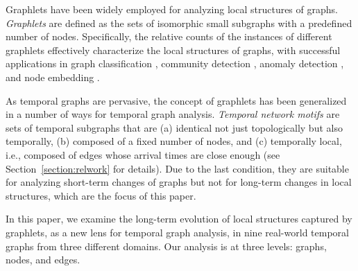 
Graphlets have been widely employed for analyzing local structures of graphs.
\textit{Graphlets} \cite{prvzulj2007biological} are defined as the sets of isomorphic small subgraphs with a predefined number of nodes.
Specifically, the relative counts of the instances of different graphlets effectively characterize the local structures of graphs, with successful applications in graph classification \cite{milo2002network,milo2004superfamilies}, community detection \cite{arenas2008motif,benson2016higher,tsourakakis2017scalable}, anomaly detection \cite{juszczyszyn2011motif}, and node embedding \cite{liu2021motif,lee2019graph,yu2019rum}.



As temporal graphs are pervasive, the concept of graphlets has been generalized in a number of ways for temporal graph analysis. 
\textit{Temporal network motifs} \cite{paranjape2017motifs, kovanen2011temporal} are sets of temporal subgraphs that are (a) identical not just topologically but also temporally, %
(b) composed of a fixed number of nodes, and (c) temporally local, i.e., composed of edges whose arrival times are close enough (see Section~\ref{section:relwork} for details).
Due to the last condition, they are suitable for analyzing short-term changes of graphs but not for long-term changes in local structures, which are the focus of this paper.  

In this paper, we examine the long-term evolution of local structures captured by graphlets, as a new lens for temporal graph analysis, in nine real-world temporal graphs from three different domains. Our analysis is at three levels: graphs, nodes, and edges. %

